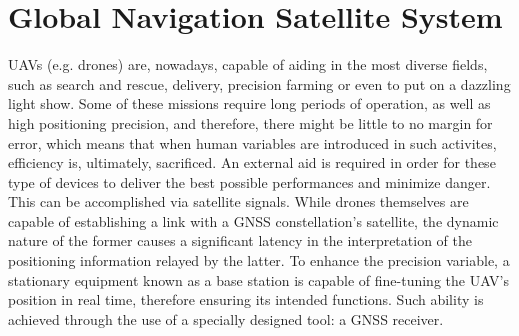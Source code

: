 





\section{Global Navigation Satellite System}\label{sec:II_gnss}

UAVs (e.g. drones) are, nowadays, capable of aiding in the most diverse fields, such as search and rescue, delivery, precision farming or even to put on a dazzling light show. Some of these missions require long periods of operation, as well as high positioning precision, and therefore, there might be little to no margin for error, which means that when human variables are introduced in such activites, efficiency is, ultimately, sacrificed. An external aid is required in order for these type of devices to deliver the best possible performances and minimize danger. This can be accomplished via satellite signals. While drones themselves are capable of establishing a link with a GNSS constellation's satellite, the dynamic nature of the former causes a significant latency in the interpretation of the positioning information relayed by the latter. To enhance the precision variable, a stationary equipment known as a base station is capable of fine-tuning the UAV's position in real time, therefore ensuring its intended functions. Such ability is achieved through the use of a specially designed tool: a GNSS receiver.


